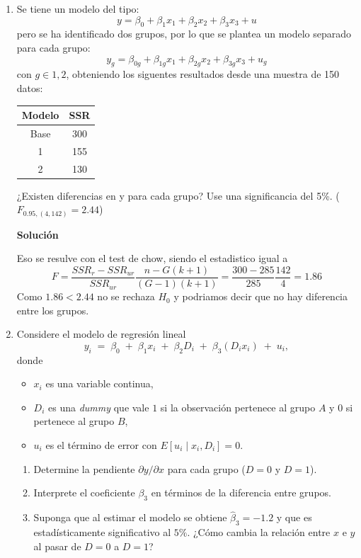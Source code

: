 \documentclass[10pt,a4paper]{article}
\begin{document}
\begin{enumerate}
\item Se tiene un modelo del tipo:
$$y = \beta_0 + \beta_1x_1 + \beta_2x_2+\beta_3x_3 + u$$
pero se ha identificado dos grupos, por lo que se plantea un modelo separado para cada grupo:
$$y_g = \beta_{0g} + \beta_{1g}x_1 + \beta_{2g}x_2+\beta_{3g}x_3 + u_g$$
con $g\in {1,2}$, obteniendo los siguentes resultados desde una muestra de 150 datos:
\begin{center}
    \begin{tabular}{|c|c|}
    \hline
        Modelo & SSR \\
        \hline
        Base & 300 \\
        \hline
        1 & 155 \\
        \hline
        2 & 130 \\
        \hline
    \end{tabular}
\end{center}
¿Existen diferencias en y para cada grupo? Use una significancia del 5\%. ($F_{0.95,(4,142)}=2.44$)

\textbf{Solución}

Eso se resulve con el test de chow, siendo el estadistico igual a 
$$F = \frac{SSR_r-SSR_{ur}}{SSR_{ur}}\frac{n-G(k+1)}{(G-1)(k+1)}=\frac{300-285}{285}\frac{142}{4}=1.86$$
Como $1.86<2.44$ no se rechaza $H_0$ y podriamos decir que no hay diferencia entre los grupos.



\item Considere el modelo de regresión lineal
\[
y_i \;=\; \beta_0 \;+\; \beta_1 x_i \;+\; \beta_2 D_i \;+\; \beta_3 (D_i x_i) \;+\; u_i,
\]
donde
\begin{itemize}
  \item $x_i$ es una variable continua,
  \item $D_i$ es una \emph{dummy} que vale $1$ si la observación pertenece al grupo $A$ y $0$ si pertenece al grupo $B$,
  \item $u_i$ es el término de error con $E[u_i \mid x_i,D_i]=0$.
\end{itemize}

\begin{enumerate}
  \item[(a)] Determine la pendiente $\partial y / \partial x$ para cada grupo ($D=0$ y $D=1$).
  \item[(b)] Interprete el coeficiente $\beta_3$ en términos de la diferencia entre grupos.
  \item[(c)] Suponga que al estimar el modelo se obtiene $\widehat{\beta}_3=-1.2$ y que es estadísticamente significativo al $5\%$.  
        ¿Cómo cambia la relación entre $x$ e $y$ al pasar de $D=0$ a $D=1$?
\end{enumerate}



\end{enumerate}
\end{document}
